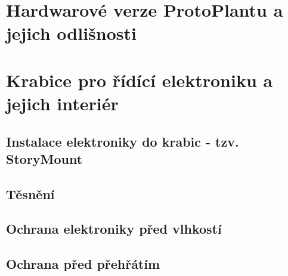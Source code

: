 \section{Hardwarové verze ProtoPlantu a jejich odlišnosti}

\section{Krabice pro řídící elektroniku a jejich interiér}

\subsection{Instalace elektroniky do krabic - tzv. StoryMount}

\subsection{Těsnění}

\subsection{Ochrana elektroniky před vlhkostí}

\subsection{Ochrana před přehřátím}

\newpage